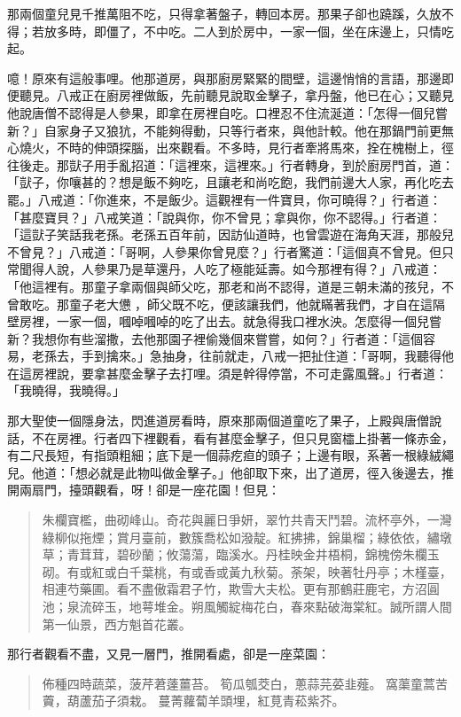 那兩個童兒見千推萬阻不吃，只得拿著盤子，轉回本房。那果子卻也蹺蹊，久放不得；若放多時，即僵了，不中吃。二人到於房中，一家一個，坐在床邊上，只情吃起。

噫！原來有這般事哩。他那道房，與那廚房緊緊的間壁，這邊悄悄的言語，那邊即便聽見。八戒正在廚房裡做飯，先前聽見說取金擊子，拿丹盤，他已在心；又聽見他說唐僧不認得是人參果，即拿在房裡自吃。口裡忍不住流涎道：「怎得一個兒嘗新？」自家身子又狼犺，不能夠得動，只等行者來，與他計較。他在那鍋門前更無心燒火，不時的伸頭探腦，出來觀看。不多時，見行者牽將馬來，拴在槐樹上，徑往後走。那獃子用手亂招道：「這裡來，這裡來。」行者轉身，到於廚房門首，道：「獃子，你嚷甚的？想是飯不夠吃，且讓老和尚吃飽，我們前邊大人家，再化吃去罷。」八戒道：「你進來，不是飯少。這觀裡有一件寶貝，你可曉得？」行者道：「甚麼寶貝？」八戒笑道：「說與你，你不曾見；拿與你，你不認得。」行者道：「這獃子笑話我老孫。老孫五百年前，因訪仙道時，也曾雲遊在海角天涯，那般兒不曾見？」八戒道：「哥啊，人參果你曾見麼？」行者驚道：「這個真不曾見。但只常聞得人說，人參果乃是草還丹，人吃了極能延壽。如今那裡有得？」八戒道：「他這裡有。那童子拿兩個與師父吃，那老和尚不認得，道是三朝未滿的孩兒，不曾敢吃。那童子老大憊𪬯，師父既不吃，便該讓我們，他就瞞著我們，才自在這隔壁房裡，一家一個，嘓啅嘓啅的吃了出去。就急得我口裡水泱。怎麼得一個兒嘗新？我想你有些溜撒，去他那園子裡偷幾個來嘗嘗，如何？」行者道：「這個容易，老孫去，手到擒來。」急抽身，往前就走，八戒一把扯住道：「哥啊，我聽得他在這房裡說，要拿甚麼金擊子去打哩。須是幹得停當，不可走露風聲。」行者道：「我曉得，我曉得。」

那大聖使一個隱身法，閃進道房看時，原來那兩個道童吃了果子，上殿與唐僧說話，不在房裡。行者四下裡觀看，看有甚麼金擊子，但只見窗櫺上掛著一條赤金，有二尺長短，有指頭粗細；底下是一個蒜疙疸的頭子；上邊有眼，系著一根綠絨繩兒。他道：「想必就是此物叫做金擊子。」他卻取下來，出了道房，徑入後邊去，推開兩扇門，擡頭觀看，呀！卻是一座花園！但見：
\begin{quote}
朱欄寶檻，曲砌峰山。奇花與麗日爭妍，翠竹共青天鬥碧。流杯亭外，一灣綠柳似拖煙；賞月臺前，數簇喬松如潑靛。紅拂拂，錦巢榴；綠依依，繡墩草；青茸茸，碧砂蘭；攸蕩蕩，臨溪水。丹桂映金井梧桐，錦槐傍朱欄玉砌。有或紅或白千葉桃，有或香或黃九秋菊。荼架，映著牡丹亭；木槿臺，相連芍藥圃。看不盡傲霜君子竹，欺雪大夫松。更有那鶴莊鹿宅，方沼圓池；泉流碎玉，地萼堆金。朔風觸綻梅花白，春來點破海棠紅。誠所謂人間第一仙景，西方魁首花叢。
\end{quote}

那行者觀看不盡，又見一層門，推開看處，卻是一座菜園：
\begin{quote}
佈種四時蔬菜，菠芹莙薘薑苔。
筍瓜瓠茭白，蔥蒜芫荽韭薤。
窩蕖童蒿苦藚，葫蘆茄子須栽。
蔓菁蘿蔔羊頭埋，紅莧青菘紫芥。
\end{quote}

